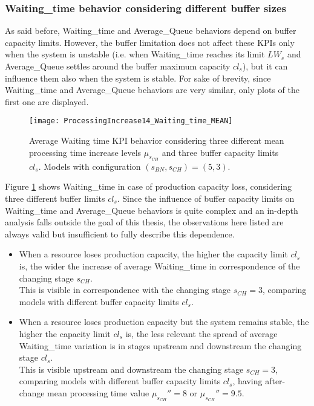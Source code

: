 \subsubsection{Waiting\_time behavior considering different buffer sizes}
As said before, Waiting\_time and Average\_Queue behaviors depend on buffer capacity limits. However, the buffer limitation does not affect these KPIs only when the system is unstable (i.e. when Waiting\_time reaches its limit $LW_s$ and Average\_Queue settles around the buffer maximum capacity $cl_s$), but it can influence them also when the system is stable. For sake of brevity, since Waiting\_time and Average\_Queue behaviors are very similar, only plots of the first one are displayed.
\begin{figure}[h] 
\centering
\texttt{[image: ProcessingIncrease14\_Waiting\_time\_MEAN]}
\caption[Average Waiting time KPI behavior with different processing time increase levels considering different buffer capacity limits]{Average Waiting time KPI behavior considering three different mean processing time increase levels $\mu_{s_{CH}}$ and three buffer capacity limits $cl_s$. Models with configuration $(s_{BN},s_{CH})=(5,3)$.}
\label{fig:Average Waiting time KPI behavior with different processing time increase levels considering different buffer capacity limits}
\end{figure}
Figure \ref{fig:Average Waiting time KPI behavior with different processing time increase levels considering different buffer capacity limits} shows Waiting\_time in case of production capacity loss, considering three different buffer limits $cl_s$. Since the influence of buffer capacity limits on Waiting\_time and Average\_Queue behaviors is quite complex and an in-depth analysis falls outside the goal of this thesis, the observations here listed are always valid but insufficient to fully describe this dependence.
\begin{itemize}
\item When a resource loses production capacity, the higher the capacity limit $cl_s$ is, the wider the increase of average Waiting\_time in correspondence of the changing stage $s_{CH}$. \\This is visible in correspondence with the changing stage $s_{CH}=3$, comparing models with different buffer capacity limits $cl_s$.
\item When a resource loses production capacity but the system remains stable, the higher the capacity limit $cl_s$ is, the less relevant the spread of average Waiting\_time variation is in stages upstream and downstream the changing stage $cl_s$. \\This is visible upstream and downstream the changing stage $s_{CH}=3$, comparing models with different buffer capacity limits $cl_s$, having after-change mean processing time value $\mu_{s_{CH}}''=8$ or $\mu_{s_{CH}}''=9.5$.
\end{itemize}
